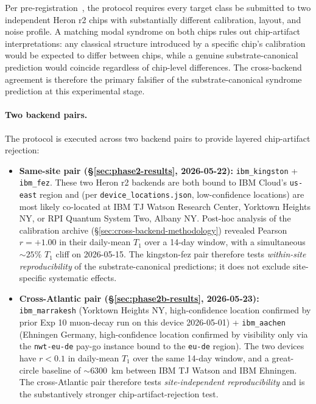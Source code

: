 \documentclass[11pt]{article}
\begin{document}
Per pre-registration~\cite{Exp12Prereg}, the protocol requires every target class be submitted to two independent Heron r2 chips with substantially different calibration, layout, and noise profile.  A matching modal syndrome on both chips rules out chip-artifact interpretations: any classical structure introduced by a specific chip's calibration would be expected to differ between chips, while a genuine substrate-canonical prediction would coincide regardless of chip-level differences.  The cross-backend agreement is therefore the primary falsifier of the substrate-canonical syndrome prediction at this experimental stage.

\paragraph{Two backend pairs.}  The protocol is executed across two backend pairs to provide layered chip-artifact rejection:

\begin{itemize}
\item \textbf{Same-site pair (\S\ref{sec:phase2-results}, 2026-05-22):} \texttt{ibm\_kingston} + \texttt{ibm\_fez}.  These two Heron r2 backends are both bound to IBM Cloud's \texttt{us-east} region and (per \texttt{device\_locations.json}, low-confidence locations) are most likely co-located at IBM TJ Watson Research Center, Yorktown Heights NY, or RPI Quantum System Two, Albany NY.  Post-hoc analysis of the calibration archive (\S\ref{sec:cross-backend-methodology}) revealed Pearson $r = +1.00$ in their daily-mean $T_1$ over a 14-day window, with a simultaneous $\sim 25\%$ $T_1$ cliff on 2026-05-15.  The kingston-fez pair therefore tests \emph{within-site reproducibility} of the substrate-canonical predictions; it does not exclude site-specific systematic effects.
\item \textbf{Cross-Atlantic pair (\S\ref{sec:phase2b-results}, 2026-05-23):} \texttt{ibm\_marrakesh} (Yorktown Heights NY, high-confidence location confirmed by prior Exp 10 muon-decay run on this device 2026-05-01) + \texttt{ibm\_aachen} (Ehningen Germany, high-confidence location confirmed by visibility only via the \texttt{nwt-eu-de} pay-go instance bound to the \texttt{eu-de} region).  The two devices have $r < 0.1$ in daily-mean $T_1$ over the same 14-day window, and a great-circle baseline of $\sim 6300$~km between IBM TJ Watson and IBM Ehningen.  The cross-Atlantic pair therefore tests \emph{site-independent reproducibility} and is the substantively stronger chip-artifact-rejection test.
\end{itemize}
\end{document}
